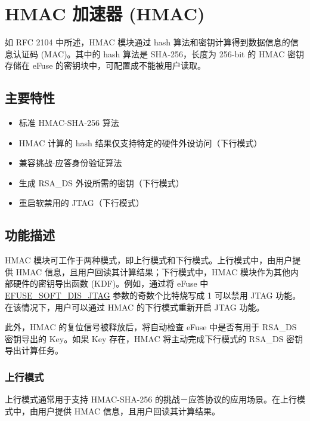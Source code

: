 \documentclass[main\_\_CN.tex]{subfiles}
\begin{document}

\ifglobal
\else
    {\let\clearpage\relax \listoftodos}
    \tableofcontents
\fi




\hypertarget{hmac}{}
\chapter{HMAC 加速器 (HMAC)}
\label{mod:hmac}


如 RFC 2104 中所述，HMAC 模块通过 hash 算法和密钥计算得到数据信息的信息认证码 (MAC)。其中的 hash 算法是 SHA-256，长度为 256-bit 的 HMAC 密钥存储在 eFuse 的密钥块中，可配置成不能被用户读取。

\section{主要特性}
\begin{itemize}
    \item 标准 HMAC-SHA-256 算法
    \item HMAC 计算的 hash 结果仅支持特定的硬件外设访问（下行模式）
    \item 兼容挑战-应答身份验证算法
    \item 生成 RSA\_DS 外设所需的密钥（下行模式）
    \item 重启软禁用的 JTAG（下行模式）
\end{itemize}


\section{功能描述}
HMAC 模块可工作于两种模式，即上行模式和下行模式。上行模式中，由用户提供 HMAC 信息，且用户回读其计算结果；下行模式中，HMAC 模块作为其他内部硬件的密钥导出函数 (KDF)。例如，通过将 eFuse 中 \hyperref[fielddesc:EFUSESOFTDISJTAG]{EFUSE\_SOFT\_DIS\_JTAG} 参数的奇数个比特烧写成 1 可以禁用 JTAG 功能。在该情况下，用户可以通过 HMAC 的下行模式重新开启 JTAG 功能。

此外，HMAC 的复位信号被释放后，将自动检查 eFuse 中是否有用于 RSA\_DS 密钥导出的 Key。如果 Key 存在，HMAC 将主动完成下行模式的 RSA\_DS 密钥导出计算任务。

\subsection{上行模式}
上行模式通常用于支持 HMAC-SHA-256 的挑战－应答协议的应用场景。在上行模式中，由用户提供 HMAC 信息，且用户回读其计算结果。
\end{document}
